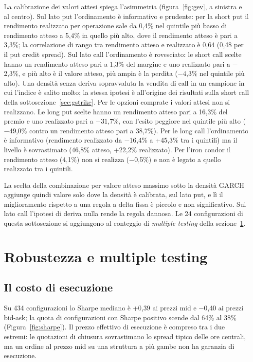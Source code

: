 \documentclass[11pt,a4paper]{article}
\begin{document}
La calibrazione dei valori attesi spiega l'asimmetria (figura~\ref{fig:gev}, a sinistra e al centro). Sul lato put l'ordinamento è informativo e prudente: per la short put il rendimento realizzato per operazione sale da 0{,}4\% nel quintile più basso di rendimento atteso a 5{,}4\% in quello più alto, dove il rendimento atteso è pari a 3{,}3\%; la correlazione di rango tra rendimento atteso e realizzato è 0{,}64 (0{,}48 per il put credit spread). Sul lato call l'ordinamento è rovesciato: le short call scelte hanno un rendimento atteso pari a 1{,}3\% del margine e uno realizzato pari a $-$2{,}3\%, e più alto è il valore atteso, più ampia è la perdita ($-$4{,}3\% nel quintile più alto). Una densità senza deriva sopravvaluta la vendita di call in un campione in cui l'indice è salito molto; la stessa ipotesi è all'origine dei risultati sulla short call della sottosezione~\ref{sec:gstrike}. Per le opzioni comprate i valori attesi non si realizzano. Le long put scelte hanno un rendimento atteso pari a 16{,}3\% del premio e uno realizzato pari a $-$31{,}7\%, con l'esito peggiore nel quintile più alto ($-$49{,}0\% contro un rendimento atteso pari a 38{,}7\%). Per le long call l'ordinamento è informativo (rendimento realizzato da $-$16{,}4\% a +45{,}3\% tra i quintili) ma il livello è sovrastimato (46{,}8\% atteso, +22{,}2\% realizzato). Per l'iron condor il rendimento atteso (4{,}1\%) non si realizza ($-$0{,}5\%) e non è legato a quello realizzato tra i quintili.

La scelta della combinazione per valore atteso massimo sotto la densità GARCH aggiunge quindi valore solo dove la densità è calibrata, sul lato put, e lì il miglioramento rispetto a una regola a delta fissa è piccolo e non significativo. Sul lato call l'ipotesi di deriva nulla rende la regola dannosa. Le 24 configurazioni di questa sottosezione si aggiungono al conteggio di \emph{multiple testing} della sezione~\ref{sec:rob}.

\section{Robustezza e multiple testing}\label{sec:rob}

\subsection{Il costo di esecuzione}

Su 434 configurazioni lo Sharpe mediano è +0{,}39 ai prezzi mid e $-$0{,}40 ai prezzi bid-ask; la quota di configurazioni con Sharpe positivo scende dal 64\% al 38\% (Figura~\ref{fig:sharpe}). Il prezzo effettivo di esecuzione è compreso tra i due estremi: le quotazioni di chiusura sovrastimano lo spread tipico delle ore centrali, ma un ordine al prezzo mid su una struttura a più gambe non ha garanzia di esecuzione.
\end{document}
